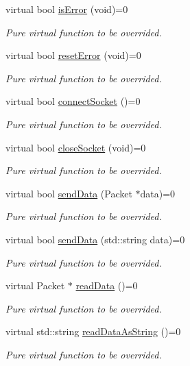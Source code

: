 \begin{CompactItemize}
virtual bool \hyperlink{classXennet_1_1DatagramSocketBase_b413bb0f043190aa4c00e3be12585510}{isError} (void)=0
\begin{CompactList}\small\item\em Pure virtual function to be overrided. \item\end{CompactList}\item 
virtual bool \hyperlink{classXennet_1_1DatagramSocketBase_26651029d023c6aa3f2bfb7c8846cef6}{resetError} (void)=0
\begin{CompactList}\small\item\em Pure virtual function to be overrided. \item\end{CompactList}\item 
virtual bool \hyperlink{classXennet_1_1DatagramSocketBase_4781f0e7666365da5d6f00ae54017e30}{connectSocket} ()=0
\begin{CompactList}\small\item\em Pure virtual function to be overrided. \item\end{CompactList}\item 
virtual bool \hyperlink{classXennet_1_1DatagramSocketBase_e149b661f5a880698d1a29d281c556ba}{closeSocket} (void)=0
\begin{CompactList}\small\item\em Pure virtual function to be overrided. \item\end{CompactList}\item 
virtual bool \hyperlink{classXennet_1_1DatagramSocketBase_9308e21ac58ded6b1e317fa8b112e97e}{sendData} (Packet $\ast$data)=0
\begin{CompactList}\small\item\em Pure virtual function to be overrided. \item\end{CompactList}\item 
virtual bool \hyperlink{classXennet_1_1DatagramSocketBase_c84e1f2bd85653a0a425190254bb5d3d}{sendData} (std::string data)=0
\begin{CompactList}\small\item\em Pure virtual function to be overrided. \item\end{CompactList}\item 
virtual Packet $\ast$ \hyperlink{classXennet_1_1DatagramSocketBase_98167a14039e4074f0de02f5c4f08446}{readData} ()=0
\begin{CompactList}\small\item\em Pure virtual function to be overrided. \item\end{CompactList}\item 
virtual std::string \hyperlink{classXennet_1_1DatagramSocketBase_0363962c4e5316675de815ede59182bc}{readDataAsString} ()=0
\begin{CompactList}\small\item\em Pure virtual function to be overrided. \item\end{CompactList}\end{CompactItemize}
